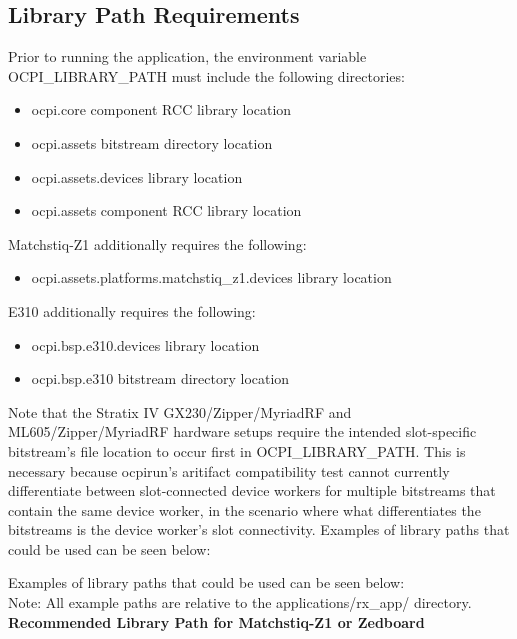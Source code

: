 \subsection{Library Path Requirements}
\noindent Prior to running the application, the environment variable OCPI\_LIBRARY\_PATH must include the following directories:\par\medskip
	\begin{itemize}
		\item ocpi.core component RCC library location
		\item ocpi.assets bitstream directory location
		\item ocpi.assets.devices library location
		\item ocpi.assets component RCC library location
	\end{itemize}
Matchstiq-Z1 additionally requires the following:
	\begin{itemize}
		\item ocpi.assets.platforms.matchstiq\_z1.devices library location
	\end{itemize}
E310 additionally requires the following:
	\begin{itemize}
		\item ocpi.bsp.e310.devices library location
		\item ocpi.bsp.e310 bitstream directory location
	\end{itemize}

\noindent Note that the Stratix IV GX230/Zipper/MyriadRF and ML605/Zipper/MyriadRF hardware setups require the intended slot-specific bitstream's file location to occur first in OCPI\_LIBRARY\_PATH. This is necessary because ocpirun's aritifact compatibility test cannot currently differentiate between slot-connected device workers for multiple bitstreams that contain the same device worker, in the scenario where what differentiates the bitstreams is the device worker's slot connectivity. Examples of library paths that could be used can be seen below:\par\medskip
\pagebreak

\noindent Examples of library paths that could be used can be seen below:\\

Note: All example paths are relative to the applications/rx\_app/ directory.\\

\noindent\textbf{Recommended Library Path for Matchstiq-Z1 or Zedboard}\\

